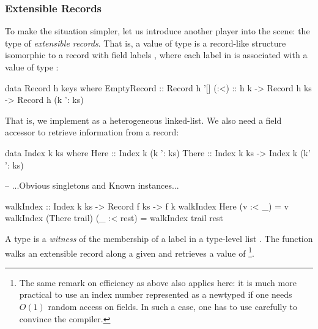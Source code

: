 \documentclass[demotion-paper.tex]{subfiles}
\begin{document}
\subsubsection{Extensible Records}
To make the situation simpler, let us introduce another player into the scene: the type  of \emph{extensible records}.
That is, a value of type  is a record-like structure isomorphic to a record with field labels , where each label  in  is associated with a value of type :
\begin{code}
data Record h keys where
  EmptyRecord :: Record h '[]
  (:<) :: h k -> Record h ks -> Record h (k ': ks)
\end{code}
That is, we implement  as a heterogeneous linked-list\footnotemark.
We also need a field accessor to retrieve information from a record:
\begin{code}
data Index k ks where
  Here  :: Index k (k ': ks)
  There :: Index k ks -> Index k (k' ': ks)

-- ...Obvious singletons and Known instances...

walkIndex :: Index k ks -> Record f ks -> f k
walkIndex Here (v :< _) = v
walkIndex (There trail) (_ :< rest) = 
  walkIndex trail rest  
\end{code}
A type  is a \emph{witness} of the membership of a label  in a type-level list .
The function  walks an extensible record along a given  and retrieves a value of \footnote{The same remark on efficiency as above also applies here: it is much more practical to use an index number represented as a newtyped  if one needs $O(1)$ random access on fields.
In such a case, one has to use  carefully to convince the compiler.}.
\end{document}
